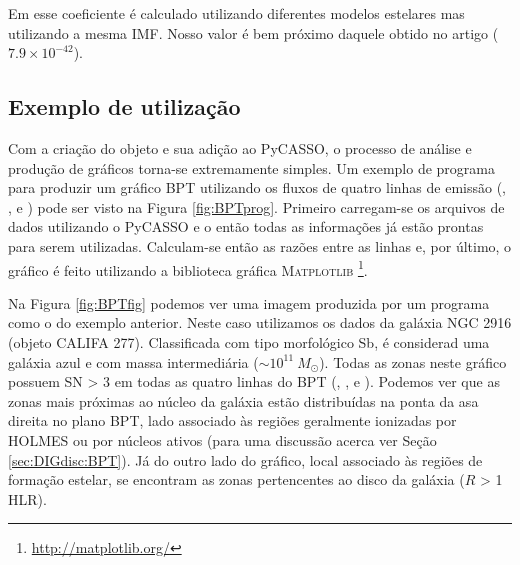 Em \citet{Kennicutt.1998a} esse coeficiente é calculado utilizando diferentes modelos estelares mas utilizando a mesma IMF. Nosso valor é bem próximo daquele obtido no artigo ($7.9 \times 10^{-42}$).

\subsection{Exemplo de utilização}
\label{apendice:EmLinesDataCube:props:example}
Com a criação do objeto \emldc e sua adição ao PyCASSO, o processo de análise e produção de gráficos torna-se extremamente simples. Um exemplo de programa para produzir um gráfico BPT \citep{Baldwin.Phillips.Terlevich.1981a} utilizando os fluxos de quatro linhas de emissão (\Ha, \Hb, \oiii e \nii) pode ser visto na Figura \ref{fig:BPTprog}. Primeiro carregam-se os arquivos de dados utilizando o PyCASSO e o \emldc então todas as informações já estão prontas para serem utilizadas. Calculam-se então as razões entre as linhas e, por último, o gráfico é feito utilizando a biblioteca gráfica M\textsc{atplotlib} \footnote{\href{http://matplotlib.org/}{http://matplotlib.org/}}.

Na Figura \ref{fig:BPTfig} podemos ver uma imagem produzida por um programa como o do exemplo anterior. Neste caso utilizamos os dados da galáxia NGC 2916 (objeto CALIFA 277). Classificada com tipo morfológico Sb, é considerad uma galáxia azul e com massa intermediária ($\sim 10^{11}\ M_\odot$). Todas as zonas neste gráfico possuem SN > 3 em todas as quatro linhas do BPT (\Hb, \oiii, \Ha e \nii). Podemos ver que as zonas mais próximas ao núcleo da galáxia estão distribuídas na ponta da asa direita no plano BPT, lado associado às regiões geralmente ionizadas por HOLMES ou por núcleos ativos (para uma discussão acerca ver Seção \ref{sec:DIGdisc:BPT}). Já do outro lado do gráfico, local associado às regiões de formação estelar, se encontram as zonas pertencentes ao disco da galáxia ($R$ > 1 HLR).


